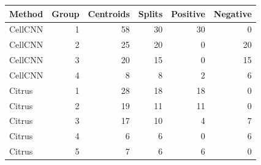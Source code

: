 \begin{tabular}{lrrrrr}
\toprule
Method & Group & Centroids & Splits & Positive & Negative \\
\midrule
CellCNN & 1 & 58 & 30 & 30 & 0 \\
CellCNN & 2 & 25 & 20 & 0 & 20 \\
CellCNN & 3 & 20 & 15 & 0 & 15 \\
CellCNN & 4 & 8 & 8 & 2 & 6 \\
Citrus & 1 & 28 & 18 & 18 & 0 \\
Citrus & 2 & 19 & 11 & 11 & 0 \\
Citrus & 3 & 17 & 10 & 4 & 7 \\
Citrus & 4 & 6 & 6 & 0 & 6 \\
Citrus & 5 & 7 & 6 & 6 & 0 \\
\bottomrule
\end{tabular}
